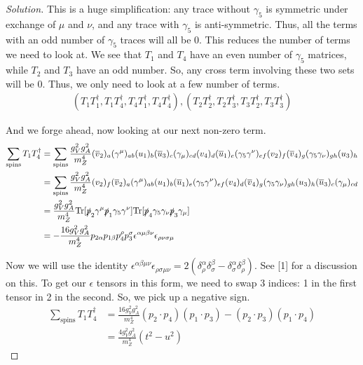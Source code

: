 \documentclass[12pt]{article}
\newenvironment{solution}{\begin{proof}[Solution]}{\end{proof}}
\begin{document}
\begin{solution}
This is a huge simplification: any trace without $\gamma_5$ is symmetric under exchange of $\mu$ and $\nu$, and any trace with $\gamma_5$ is anti-symmetric. Thus, all the terms with an odd number of $\gamma_5$ traces will all be 0. This reduces the number of terms we need to look at. We see that $T_1$ and $T_4$ have an even number of $\gamma_5$ matrices, while $T_2$ and $T_3$ have an odd number. So, any cross term involving these two sets will be 0. Thus, we only need to look at a few number of terms.
\begin{align*}
    (T_1T_1^\dagger, T_1T_4^\dagger, T_4T_1^\dagger, T_4T_4^\dagger), (T_2T_2^\dagger, T_2T_3^\dagger, T_3T_2^\dagger, T_3T_3^\dagger)
\end{align*}

And we forge ahead, now looking at our next non-zero term.
\begin{align*}
    \sum_\text{spins}T_1T_4^\dagger&=\sum_\text{spins}\frac{g_V^2g_A^2}{m_Z^4}(\overline{v}_2)_a (\gamma^\mu)_{ab}(u_1)_b (\overline{u}_3)_c (\gamma_\mu)_{cd} (v_4)_d (\overline{u}_1)_e (\gamma_5\gamma^\nu)_{ef}(v_2)_f (\overline{v}_4)_g (\gamma_5\gamma_\nu)_{gh} (u_3)_h \\
    &= \sum_\text{spins}\frac{g_V^2g_A^2}{m_Z^4}(v_2)_f(\overline{v}_2)_a (\gamma^\mu)_{ab}(u_1)_b(\overline{u}_1)_e (\gamma_5\gamma^\nu)_{ef}(v_4)_d(\overline{v}_4)_g (\gamma_5\gamma_\nu)_{gh} (u_3)_h(\overline{u}_3)_c (\gamma_\mu)_{cd} \\
    &= \frac{g_V^2g_A^2}{m_Z^4}\text{Tr}[\slashed{p}_2\gamma^\mu\slashed{p}_1\gamma_5\gamma^\nu]\text{Tr}[\slashed{p}_4\gamma_5\gamma_\nu\slashed{p}_3\gamma_\mu] \\
    &= -\frac{16g_V^2g_A^2}{m_Z^4}p_{2\alpha}p_{1\beta}p_4^\rho p_3^\sigma \epsilon^{\alpha\mu\beta\nu}\epsilon_{\rho\nu\sigma\mu}
\end{align*}

Now we will use the identity $\epsilon^{\alpha\beta\mu\nu}\epsilon_{\rho\sigma\mu\nu}=2(\delta^\alpha_\rho\delta^\beta_\sigma-\delta^\alpha_\sigma\delta^\beta_\rho)$. See [1] for a discussion on this. To get our $\epsilon$ tensors in this form, we need to swap 3 indices: 1 in the first tensor in 2 in the second. So, we pick up a negative sign.
\begin{align*}
    \sum_\text{spins}T_1T_4^\dagger&=\frac{16g_V^2g_A^2}{m_Z^4}(p_2\cdot p_4)(p_1 \cdot p_3)-(p_2\cdot p_3)(p_1 \cdot p_4) \\
    &= \frac{4g_V^2g_A^2}{m_Z^4}(t^2-u^2)
\end{align*}


\end{solution}
\end{document}
